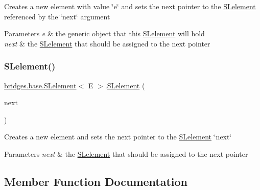 Creates a new element with value \char`\"{}e\char`\"{} and sets the next pointer to the \hyperlink{classbridges_1_1base_1_1_s_lelement}{S\+Lelement} referenced by the \char`\"{}next\char`\"{} argument 
\begin{DoxyParams}{Parameters}
{\em e} & the generic object that this \hyperlink{classbridges_1_1base_1_1_s_lelement}{S\+Lelement} will hold \\
\hline
{\em next} & the \hyperlink{classbridges_1_1base_1_1_s_lelement}{S\+Lelement} that should be assigned to the next pointer \\
\hline
\end{DoxyParams}
\hypertarget{classbridges_1_1base_1_1_s_lelement_ab5b1c20ba1d1923fad0780052fb51c99}{}\label{classbridges_1_1base_1_1_s_lelement_ab5b1c20ba1d1923fad0780052fb51c99} 
\subsubsection{\texorpdfstring{S\+Lelement()}{SLelement()}\hspace{0.1cm}{\footnotesize\ttfamily [4/4]}}
{\footnotesize\ttfamily \hyperlink{classbridges_1_1base_1_1_s_lelement}{bridges.\+base.\+S\+Lelement}$<$ E $>$.\hyperlink{classbridges_1_1base_1_1_s_lelement}{S\+Lelement} (\begin{DoxyParamCaption}\item[{\hyperlink{classbridges_1_1base_1_1_s_lelement}{S\+Lelement}$<$ E $>$}]{next }\end{DoxyParamCaption})}

Creates a new element and sets the next pointer to the \hyperlink{classbridges_1_1base_1_1_s_lelement}{S\+Lelement} \char`\"{}next\char`\"{} 
\begin{DoxyParams}{Parameters}
{\em next} & the \hyperlink{classbridges_1_1base_1_1_s_lelement}{S\+Lelement} that should be assigned to the next pointer \\
\hline
\end{DoxyParams}


\subsection{Member Function Documentation}
\hypertarget{classbridges_1_1base_1_1_s_lelement_a8c48a2d34b238fa0ae7bf2d1ee58ea88}{}\label{classbridges_1_1base_1_1_s_lelement_a8c48a2d34b238fa0ae7bf2d1ee58ea88} 
